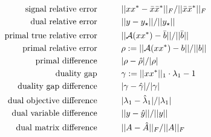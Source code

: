 \begin{subequations}  		\label{Eqn:term_crit-candidate_residuals}
\begin{align}
\text{signal relative error}
	& \hspace{1cm}	||xx^* - \bar{x}\bar{x}^*||_F / ||\bar{x}\bar{x}^*||_F \\
\text{dual relative error}
	&	\hspace{1cm} 	||y - y_\star|| / ||y_\star|| 	\\	
\text{primal true relative error}
	& \hspace{1cm} ||{\mathcal A}(xx^*)-\bar{b}|| / ||\bar{b}||  \\
\text{primal relative error}
	& \hspace{1cm}	\rho := ||{\mathcal A}(xx^*) - b|| / ||b||	 \\
\text{primal difference}
	& \hspace{1cm}	|\rho - \hat{\rho} | / | \rho| \\
\text{duality gap}
	& \hspace{1cm}	\gamma := ||xx^*||_1 \cdot \lambda_1 - 1 \\
\text{duality gap difference}
	& \hspace{1cm}	|\gamma - \hat{\gamma} | / |\gamma| \\
\text{dual objective difference}
	& \hspace{1cm}	|\lambda_1 - \hat{\lambda}_1| / |\lambda_1| \\
\text{dual variable difference}
	& \hspace{1cm}	||y- \hat{y}|| / ||y|| \\
\text{dual matrix difference}
	& \hspace{1cm}	||A - \hat{A}||_F / ||A||_F
\end{align}
\end{subequations}

